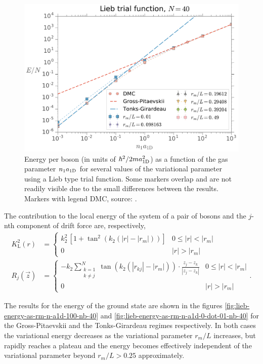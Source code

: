 %
\begin{figure}[t!]
  \centering
  \includegraphics[width=0.75\linewidth]{./figures/lieb_energy-as-n-a1d_rm-var_Nb-40}
  \caption{Energy per boson (in units of $\hbar^2/2ma_{ \mathrm{1D} }^2$) as a function
    of the gas parameter ${{n}_1} a_{ \mathrm{1D} }$ for several values of the
    variational parameter using a Lieb type trial function.  Some markers
    overlap and are not readily visible due to the small differences between the
    results. Markers with 	legend {DMC}, source:
    \cite{bib:astrakharchik-phys-rev-a.68.031602.2003}. }
  \label{fig:lieb-energy-as-n-a1d-rm-var-nb-40}
\end{figure}
%
The contribution to the local energy of the system of a pair of bosons and the
$j$-nth component of drift force are, respectively,
%
\begin{align}
  K_{\mathrm{L}}^2(r) & = \begin{cases}
    k_2^2 \, [1 + \tan^2(k_2(|r| - |r_m|))] & 0 \leq |r| < |r_m| \\
    0                                       & |r| > |r_m|
  \end{cases}  \\
  R_{j}(\vec z)       & = \begin{cases}
    -k_2 \displaystyle \sum_{\substack{k=1 \\ k \neq j}}^{N} \tan(k_2(|r_{kj}| - |r_m|)) \cdot \frac{z_j - z_k}{|z_j - z_k|} & 0 \leq |r| < |r_m| \\
    0 & |r| > |r_m|
  \end{cases}.
\end{align}
%

The results for the energy of the ground state are shown in the figures
\ref{fig:lieb-energy-as-rm-n-a1d-100-nb-40} and
\ref{fig:lieb-energy-as-rm-n-a1d-0-dot-01-nb-40} for the Gross-Pitaevskii and
the Tonks-Girardeau regimes respectively. In both cases the variational energy
decreases as the variational parameter $r_m / L$ increases, but rapidly reaches
a plateau and the energy becomes effectively independent of the variational
parameter beyond $r_m / L > 0.25$ approximately.

